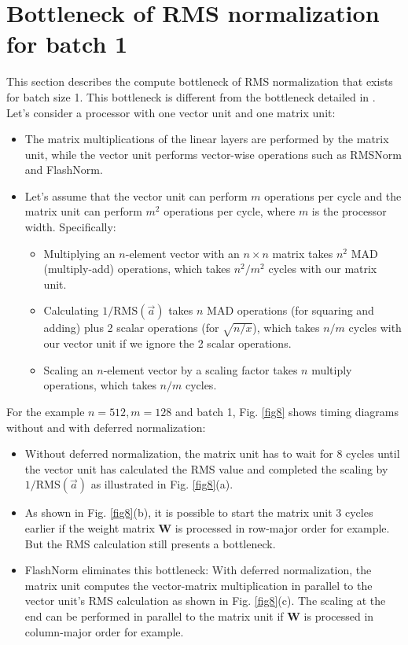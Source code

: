 \documentclass{article}
\newcommand{\mat}[1]{\mathbf{#1}}     %
\def\rms{\text{RMS}(\vec{a})}         %
\begin{document}
\section{Bottleneck of RMS normalization for batch 1}
This section describes the compute bottleneck of RMS normalization that exists for batch size 1. This bottleneck is different from the bottleneck detailed in \citep{openelm}. Let’s consider a processor with one vector unit and one matrix unit:
\begin{itemize}[topsep=-1pt, itemsep=-1pt]
  \item The matrix multiplications of the linear layers are performed by the matrix unit, while the vector unit performs vector-wise operations such as RMSNorm and FlashNorm.
  \item Let’s assume that the vector unit can perform $m$ operations per cycle and the matrix unit can perform $m^2$ operations per cycle, where $m$ is the processor width. Specifically:
  \begin{itemize}[topsep=-1pt, itemsep=-1pt]
    \item Multiplying an $n$-element vector with an $n \times n$ matrix takes $n^2$ MAD (multiply-add) operations, which takes $n^2/m^2$ cycles with our matrix unit.
    \item Calculating $1/\rms$ takes $n$ MAD operations (for squaring and adding) plus 2 scalar operations (for $\sqrt{n/x}$), which takes $n/m$ cycles with our vector unit if we ignore the 2 scalar operations.
    \item Scaling an $n$-element vector by a scaling factor takes $n$ multiply operations, which takes $n/m$ cycles.
  \end{itemize}
\end{itemize}

For the example $n = 512, m = 128$ and batch 1, Fig. \ref{fig8} shows timing diagrams without and with deferred normalization:
\begin{itemize}[topsep=-1pt, itemsep=-1pt]
  \item Without deferred normalization, the matrix unit has to wait for 8 cycles until the vector unit has calculated the RMS value and completed the scaling by $1/ \rms$ as illustrated in Fig. \ref{fig8}(a).
  \item As shown in Fig. \ref{fig8}(b), it is possible to start the matrix unit 3 cycles earlier if the weight matrix $\mat{W}$ is processed in row-major order for example. But the RMS calculation still presents a bottleneck.
  \item FlashNorm eliminates this bottleneck: With deferred normalization, the matrix unit computes the vector-matrix multiplication in parallel to the vector unit's RMS calculation as shown in Fig. \ref{fig8}(c). The scaling at the end can be performed in parallel to the matrix unit if $\mat{W}$ is processed in column-major order for example.
\end{itemize}
\end{document}
